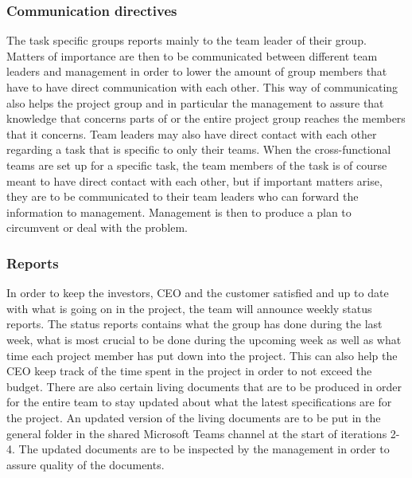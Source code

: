 \subsubsection{Communication directives}
The task specific groups reports mainly to the team leader of their group. Matters of importance are then to be communicated between different team leaders and management in order to lower the amount of group members that have to have direct communication with each other. This way of communicating also helps the project group and in particular the management to assure that knowledge that concerns parts of or the entire project group reaches the members that it concerns. Team leaders may also have direct contact with each other regarding a task that is specific to only their teams. When the cross-functional teams are set up for a specific task, the team members of the task is of course meant to have direct contact with each other, but if important matters arise, they are to be communicated to their team leaders who can forward the information to management. Management is then to produce a plan to circumvent or deal with the problem. 

\subsubsection{Reports}
In order to keep the investors, CEO and the customer satisfied and up to date with what is going on in the project, the team will announce weekly status reports. The status reports contains what the group has done during the last week, what is most crucial to be done during the upcoming week as well as what time each project member has put down into the project. This can also help the CEO keep track of the time spent in the project in order to not exceed the budget. There are also certain living documents that are to be produced in order for the entire team to stay updated about what the latest specifications are for the project. An updated version of the living documents are to be put in the general folder in the shared Microsoft Teams channel at the start of iterations 2-4. The updated documents are to be inspected by the management in order to assure quality of the documents. 
